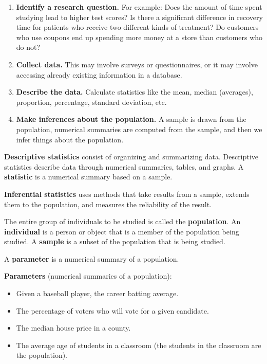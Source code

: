 \documentclass{ximera}
\begin{document}
\begin{enumerate}
  \item[a)] \textbf{Identify a research question.} For example: Does the amount of time spent studying lead to higher test scores? Is there a significant difference in recovery time for patients who receive two different kinds of treatment? Do customers who use coupons end up spending more money at a store than customers who do not?
  \item[b)] \textbf{Collect data.} This may involve surveys or questionnaires, or it may involve accessing already existing information in a database.
  \item[c)] \textbf{Describe the data.} Calculate statistics like the mean, median (averages), proportion, percentage, standard deviation, etc.
  \item[d)] \textbf{Make inferences about the population.} A sample is drawn from the population, numerical summaries are computed from the sample, and then we infer things about the population.
\end{enumerate}

\begin{definition}
\textbf{Descriptive statistics} consist of organizing and summarizing data. Descriptive statistics describe data through numerical summaries, tables, and graphs. A \textbf{statistic} is a numerical summary based on a sample.

\textbf{Inferential statistics} uses methods that take results from a sample, extends them to the population, and measures the reliability of the result.
\end{definition}

\begin{definition}
The entire group of individuals to be studied is called the \textbf{population}. An \textbf{individual} is a person or object that is a member of the population being studied. A \textbf{sample} is a subset of the population that is being studied.
\end{definition}

\begin{definition}
A \textbf{parameter} is a numerical summary of a population.
\end{definition}

\textbf{Parameters} (numerical summaries of a population):
\begin{itemize}
  \item Given a baseball player, the career batting average.
  \item The percentage of voters who will vote for a given candidate.
  \item The median house price in a county.
  \item The average age of students in a classroom (the students in the classroom are the population).
\end{itemize}
\end{document}
